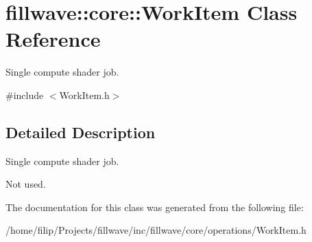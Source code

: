 \hypertarget{classfillwave_1_1core_1_1WorkItem}{}\section{fillwave\+:\+:core\+:\+:Work\+Item Class Reference}
\label{classfillwave_1_1core_1_1WorkItem}


Single compute shader job.  




{\ttfamily \#include $<$Work\+Item.\+h$>$}



\subsection{Detailed Description}
Single compute shader job. 

Not used. 

The documentation for this class was generated from the following file\+:\begin{DoxyCompactItemize}
\item 
/home/filip/\+Projects/fillwave/inc/fillwave/core/operations/Work\+Item.\+h\end{DoxyCompactItemize}
